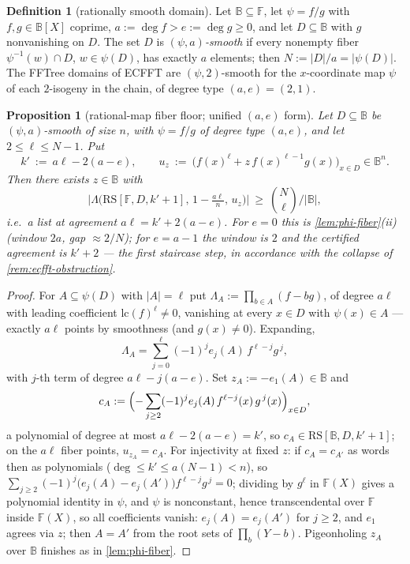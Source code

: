 \documentclass[11pt]{article}
\newtheorem{proposition}[proposition]{Proposition}
\theoremstyle{definition}
\newtheorem{definition}[definition]{Definition}
\theoremstyle{remark}
\newcommand{\F}{\mathbb{F}}
\newcommand{\B}{\mathbb{B}}
\newcommand{\RS}{\mathrm{RS}}
\newcommand{\Lst}{\Lambda}
\newcommand{\eone}{e_1}
\begin{document}
\begin{definition}[rationally smooth domain]\label{def:rational-smooth}
Let $\B\subseteq\F$, let $\psi=f/g$ with $f,g\in\B[X]$ coprime, $a:=\deg f>e:=\deg g\ge0$, and let $D\subseteq\B$ with $g$ nonvanishing on $D$. The set $D$ is \emph{$(\psi,a)$-smooth} if every nonempty fiber $\psi^{-1}(w)\cap D$, $w\in\psi(D)$, has exactly $a$ elements; then $N:=|D|/a=|\psi(D)|$. The FFTree domains of ECFFT \cite{BCKL21} are $(\psi,2)$-smooth for the $x$-coordinate map $\psi$ of each $2$-isogeny in the chain, of degree type $(a,e)=(2,1)$.
\end{definition}

\begin{proposition}[rational-map fiber floor; unified $(a,e)$ form]\label{prop:rational-floor}
Let $D\subseteq\B$ be $(\psi,a)$-smooth of size $n$, with $\psi=f/g$ of degree type $(a,e)$, and let $2\le\ell\le N-1$. Put
\[
k'\ :=\ a\ell-2(a-e),
\qquad
u_z\ :=\ \bigl(f(x)^{\ell}+z\,f(x)^{\ell-1}g(x)\bigr)_{x\in D}\in\B^n .
\]
Then there exists $z\in\B$ with
\[
\bigl|\Lst\bigl(\RS[\F,D,k'+1],\,1-\tfrac{a\ell}n,\,u_z\bigr)\bigr|\ \ge\ \binom N{\ell}\Big/|\B| ,
\]
i.e.\ a list at agreement $a\ell=k'+2(a-e)$. For $e=0$ this is \cref{lem:phi-fiber}\textup{(ii)} \textup(window $2a$, gap $\approx2/N$\textup); for $e=a-1$ the window is $2$ and the certified agreement is $k'+2$ --- the first staircase step, in accordance with the collapse of \cref{rem:ecfft-obstruction}.
\end{proposition}

\begin{proof}
For $A\subseteq\psi(D)$ with $|A|=\ell$ put $\Lambda_A:=\prod_{b\in A}(f-bg)$, of degree $a\ell$ with leading coefficient $\mathrm{lc}(f)^\ell\ne0$, vanishing at every $x\in D$ with $\psi(x)\in A$ --- exactly $a\ell$ points by smoothness \textup(and $g(x)\ne0$\textup). Expanding,
\[
\Lambda_A=\sum_{j=0}^{\ell}(-1)^je_j(A)\,f^{\ell-j}g^{\,j},
\]
with $j$-th term of degree $a\ell-j(a-e)$. Set $z_A:=-\eone(A)\in\B$ and
\[
c_A:=\Bigl(-\sum_{j\ge2}(-1)^je_j(A)\,f^{\ell-j}(x)\,g^{\,j}(x)\Bigr)_{x\in D},
\]
a polynomial of degree at most $a\ell-2(a-e)=k'$, so $c_A\in\RS[\B,D,k'+1]$; on the $a\ell$ fiber points, $u_{z_A}=c_A$. For injectivity at fixed $z$: if $c_A=c_{A'}$ as words then as polynomials \textup($\deg\le k'\le a(N-1)<n$\textup), so $\sum_{j\ge2}(-1)^j\bigl(e_j(A)-e_j(A')\bigr)f^{\ell-j}g^{\,j}=0$; dividing by $g^{\ell}$ in $\F(X)$ gives a polynomial identity in $\psi$, and $\psi$ is nonconstant, hence transcendental over $\F$ inside $\F(X)$, so all coefficients vanish: $e_j(A)=e_j(A')$ for $j\ge2$, and $\eone$ agrees via $z$; then $A=A'$ from the root sets of $\prod_{b}(Y-b)$. Pigeonholing $z_A$ over $\B$ finishes as in \cref{lem:phi-fiber}.
\end{proof}
\end{document}
